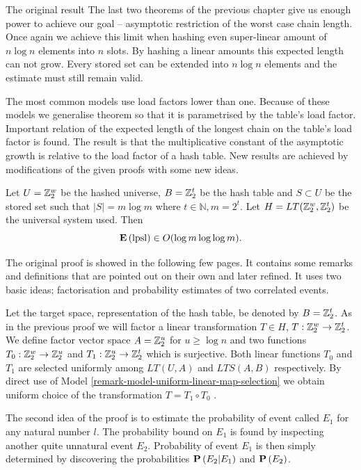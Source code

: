 \begin{section}{The original result}
The last two theorems of the previous chapter give us enough power to achieve our goal -- asymptotic restriction of the worst case chain length. Once again we achieve this limit when hashing even super-linear amount of $n \log n$ elements into $n$ slots. By hashing a linear amounts this expected length can not grow. Every stored set can be extended into $n \log n$ elements and the estimate must still remain valid. 

The most common models use load factors lower than one. Because of these models we generalise theorem so that it is parametrised by the table's load factor. Important relation of the expected length of the longest chain on the table's load factor is found. The result is that the multiplicative constant of the asymptotic growth is relative to the load factor of a hash table. New results are achieved by modifications of the given proofs with some new ideas.

\begin{theorem}
\label{theorem-n-logn-to-n}
Let $U = \mathbb{Z}_{2}^{w}$ be the hashed universe, $B = \mathbb{Z}_{2}^{t}$ be the hash table and $S \subset U$ be the stored set such that $|S| = m \log m$ where $t \in \mathbb{N}, m = 2 ^ t$. Let $H = LT(\mathbb{Z}_{2}^{w}, \mathbb{Z}_{2}^{t})$ be the universal system used. Then 
\[
	\mathbf{E}\left(\mathrm{lpsl}\right) \in O(\log m \log \log m) \text{.}
\]
\end{theorem}
The original proof is showed in the following few pages. It contains some remarks and definitions that are pointed out on their own and later refined. It uses two basic ideas; factorisation and probability estimates of two correlated events.

Let the target space, representation of the hash table, be denoted by $B = \mathbb{Z}_{2}^{t}$. As in the previous proof we will factor a linear transformation $T \in H$, $T: \mathbb{Z}_{2}^{w} \rightarrow \mathbb{Z}_{2}^{t}$. We define factor vector space $A = \mathbb{Z}_{2}^{u}$ for $u \geq \log n$ and two functions $T_0: \mathbb{Z}_{2}^{w} \rightarrow \mathbb{Z}_{2}^{u}$ and $T_1: \mathbb{Z}_{2}^{u} \rightarrow \mathbb{Z}_{2}^{t}$ which is surjective. Both linear functions $T_0$ and $T_1$ are selected uniformly among $LT(U, A)$ and $LTS(A, B)$ respectively. By direct use of Model \ref{remark-model-uniform-linear-map-selection} we obtain uniform choice of the transformation $T = T_1 \circ T_0$ .

The second idea of the proof is to estimate the probability of event called $E_1$ for any natural number $l$. The probability bound on $E_1$ is found by inspecting another quite unnatural event $E_2$. Probability of event $E_1$ is then simply determined by discovering the probabilities $\mathbf{P}\left(E_2 | E_1\right)$ and $\mathbf{P}\left(E_2\right)$.


\end{section}

